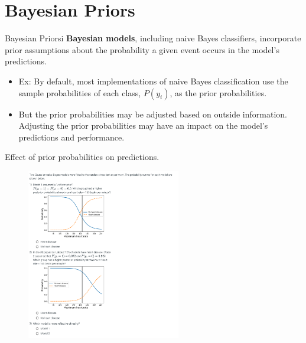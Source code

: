 \documentclass[10pt,dvipsnames]{beamer}
\begin{document}
\section{Bayesian Priors}
\begin{frame}{Bayesian Priorsi}
	\textbf{Bayesian models}, including naive Bayes classifiers, incorporate prior assumptions about the probability a given event occurs in the model's
	predictions. 
	\begin{itemize}
		\item  Ex: By default, most implementations of naive Bayes classification use the sample probabilities of each class, \(P\left(y_{i}\right)\), as the
		prior probabilities.
		\item  But the prior probabilities may be adjusted based on outside information. Adjusting the prior probabilities may have an impact on the model's predictions and performance.
	\end{itemize}
\end{frame}

\begin{frame}{Effect of prior probabilities on predictions.}
		\begin{figure}[ht]
		\centering
		\includegraphics[width=0.6\textwidth]{imgs/nb_26.png}
	\end{figure}
\end{frame}
\end{document}
